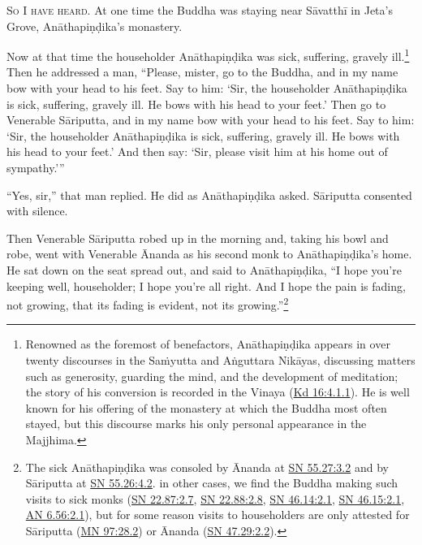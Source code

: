 \documentclass[12pt,openany]{book}%
\newcommand*{\scevam}[1]{\textsc{#1}}
\begin{document}
\scevam{So I have heard. }At one time the Buddha was staying near \textsanskrit{Sāvatthī} in Jeta’s Grove, \textsanskrit{Anāthapiṇḍika}’s monastery. 

Now at that time the householder \textsanskrit{Anāthapiṇḍika} was sick, suffering, gravely ill.\footnote{Renowned as the foremost of benefactors, \textsanskrit{Anāthapiṇḍika} appears in over twenty discourses in the \textsanskrit{Saṁyutta} and \textsanskrit{Aṅguttara} \textsanskrit{Nikāyas}, discussing matters such as generosity, guarding the mind, and the development of meditation; the story of his conversion is recorded in the Vinaya (\href{https://suttacentral.net/pli-tv-kd16/en/sujato\#4.1.1}{Kd 16:4.1.1}). He is well known for his offering of the monastery at which the Buddha most often stayed, but this discourse marks his only personal appearance in the Majjhima. } Then he addressed a man, “Please, mister, go to the Buddha, and in my name bow with your head to his feet. Say to him: ‘Sir, the householder \textsanskrit{Anāthapiṇḍika} is sick, suffering, gravely ill. He bows with his head to your feet.’ Then go to Venerable \textsanskrit{Sāriputta}, and in my name bow with your head to his feet. Say to him: ‘Sir, the householder \textsanskrit{Anāthapiṇḍika} is sick, suffering, gravely ill. He bows with his head to your feet.’ And then say: ‘Sir, please visit him at his home out of sympathy.’” 

“Yes, sir,” that man replied. He did as \textsanskrit{Anāthapiṇḍika} asked. \textsanskrit{Sāriputta} consented with silence. 

Then Venerable \textsanskrit{Sāriputta} robed up in the morning and, taking his bowl and robe, went with Venerable Ānanda as his second monk to \textsanskrit{Anāthapiṇḍika}’s home. He sat down on the seat spread out, and said to \textsanskrit{Anāthapiṇḍika}, “I hope you’re keeping well, householder; I hope you’re all right. And I hope the pain is fading, not growing, that its fading is evident, not its growing.”\footnote{The sick \textsanskrit{Anāthapiṇḍika} was consoled by Ānanda at \href{https://suttacentral.net/sn55.27/en/sujato\#3.2}{SN 55.27:3.2} and by \textsanskrit{Sāriputta} at \href{https://suttacentral.net/sn55.26/en/sujato\#4.2}{SN 55.26:4.2}. in other cases, we find the Buddha making such visits to sick monks (\href{https://suttacentral.net/sn22.87/en/sujato\#2.7}{SN 22.87:2.7}, \href{https://suttacentral.net/sn22.88/en/sujato\#2.8}{SN 22.88:2.8}, \href{https://suttacentral.net/sn46.14/en/sujato\#2.1}{SN 46.14:2.1}, \href{https://suttacentral.net/sn46.15/en/sujato\#2.1}{SN 46.15:2.1}, \href{https://suttacentral.net/an6.56/en/sujato\#2.1}{AN 6.56:2.1}), but for some reason visits to householders are only attested for \textsanskrit{Sāriputta} (\href{https://suttacentral.net/mn97/en/sujato\#28.2}{MN 97:28.2}) or Ānanda (\href{https://suttacentral.net/sn47.29/en/sujato\#2.2}{SN 47.29:2.2}). } 
\end{document}
